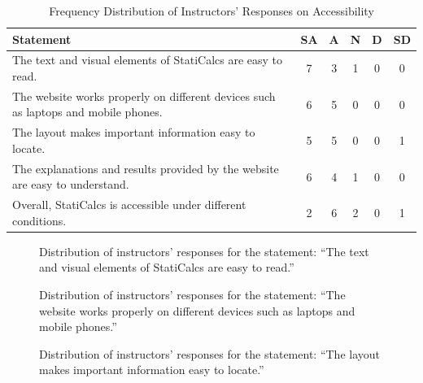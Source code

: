 
\begin{table}[H]
\centering
\caption{Frequency Distribution of Instructors’ Responses on Accessibility}
\renewcommand{\arraystretch}{1.3}
\begin{tabular}{p{8cm}ccccc}
\hline
\textbf{Statement} & \textbf{SA} & \textbf{A} & \textbf{N} & \textbf{D} & \textbf{SD}\\
\hline
The text and visual elements of StatiCalcs are easy to read. & 7 & 3 & 1 & 0 & 0\\
The website works properly on different devices such as laptops and mobile phones. & 6 & 5 & 0 & 0 & 0\\
The layout makes important information easy to locate. & 5 & 5 & 0 & 0 & 1\\
The explanations and results provided by the website are easy to understand. & 6 & 4 & 1 & 0 & 0\\
Overall, StatiCalcs is accessible under different conditions. & 2 & 6 & 2 & 0 & 1\\
\hline
\end{tabular}
\end{table}

\begin{figure}[H]
\centering
{}
\caption{Distribution of instructors' responses for the statement: ``The text and visual elements of StatiCalcs are easy to read.''}
\end{figure}


\begin{figure}[H]
\centering
{}
\caption{Distribution of instructors' responses for the statement: ``The website works properly on different devices such as laptops and mobile phones.''}
\end{figure}


\begin{figure}[H]
\centering
{}
\caption{Distribution of instructors' responses for the statement: ``The layout makes important information easy to locate.''}
\end{figure}


